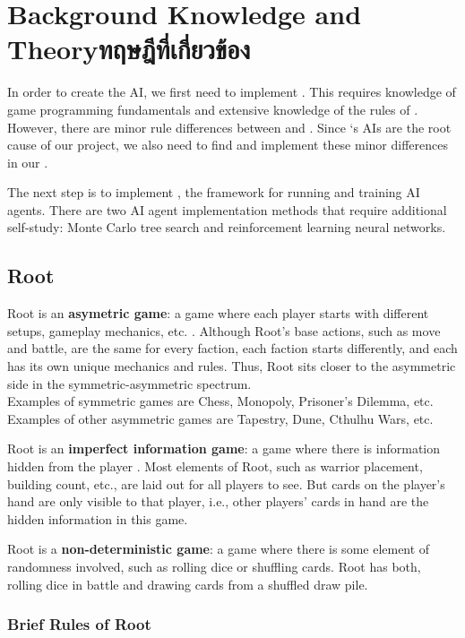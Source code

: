 \chapter{\ifenglish Background Knowledge and Theory\else ทฤษฎีที่เกี่ยวข้อง\fi}

In order to create the AI, we first need to implement \RootOurs{}. This requires knowledge of game programming fundamentals and extensive knowledge of the rules of \RootB{}. However, there are minor rule differences between \RootV{} and \RootB{}. Since \RootV{}`s AIs are the root cause of our project, we also need to find and implement these minor differences in our \RootOurs{}.

The next step is to implement \RootAI{}, the framework for running \RootOurs{} and training AI agents. There are two AI agent implementation methods that require additional self-study: Monte Carlo tree search and reinforcement learning neural networks.

\section{Root}
Root is an \textbf{asymetric game}: a game where each player starts with different setups, gameplay mechanics, etc. \cite{Mike_Shor-2023-10-06}. Although Root's base actions, such as move and battle, are the same for every faction, each faction starts differently, and each has its own unique mechanics and rules. Thus, Root sits closer to the asymmetric side in the symmetric-asymmetric spectrum. \\
Examples of symmetric games are Chess, Monopoly, Prisoner's Dilemma, etc.\\
Examples of other asymmetric games are Tapestry, Dune, Cthulhu Wars, etc.

Root is an \textbf{imperfect information game}: a game where there is information hidden from the player \cite{osborne1994course}. Most elements of Root, such as warrior placement, building count, etc., are laid out for all players to see. But cards on the player's hand are only visible to that player, i.e., other players' cards in hand are the hidden information in this game.

Root is a \textbf{non-deterministic game}: a game where there is some element of randomness involved, such as rolling dice or shuffling cards. Root has both, rolling dice in battle and drawing cards from a shuffled draw pile.

\subsection{Brief Rules of Root} \label{brief-rules-of-root}

